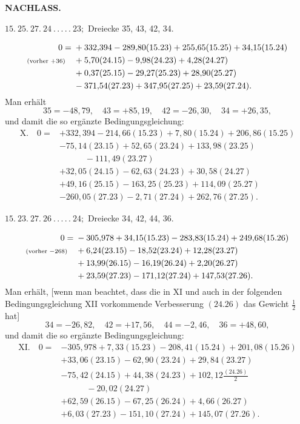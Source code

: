 \newpage
{}\hfill\textbf{NACHLASS.}
\begin{center}
$15.\ 25.\ 27.\ 24\ .\,.\,.\,.\,.\ 23;$ Dreiecke 35, 43, 42, 34.
\end{center}
\[
\begin{aligned}
0={}&+332{,}394-289{,}80(15.23)+255{,}65(15.25)+34{,}15(15.24)\\
\text{\scriptsize(vorher $+36$)}\quad&+5{,}70(24.15)-9{,}98(24.23)+4{,}28(24.27)\\
&+0{,}37(25.15)-29{,}27(25.23)+28{,}90(25.27)\\
&-371{,}54(27.23)+347{,}95(27.25)+23{,}59(27.24).
\end{aligned}
\]
Man erhält
\[
35=-48{,}79,\quad43=+85{,}19,\quad42=-26{,}30,\quad34=+26{,}35,
\]
und damit die so ergänzte Bedingungsgleichung:
\[
\begin{aligned}
\mathrm{X.}\quad0={}&+332{,}394-214{,}66(15.23)+7{,}80(15.24)+206{,}86(15.25)\\
&-75{,}14(23.15)+52{,}65(23.24)+133{,}98(23.25)\\
&\qquad\quad-111{,}49(23.27)\\
&+32{,}05(24.15)-62{,}63(24.23)+30{,}58(24.27)\\
&+49{,}16(25.15)-163{,}25(25.23)+114{,}09(25.27)\\
&-260{,}05(27.23)-2{,}71(27.24)+262{,}76(27.25).
\end{aligned}
\]

\par\bigskip
\begin{center}
$15.\ 23.\ 27.\ 26\ .\,.\,.\,.\,.\ 24;$ Dreiecke 34, 42, 44, 36.
\end{center}
\[
\begin{aligned}
0={}&-305{,}978+34{,}15(15.23)-283{,}83(15.24)+249{,}68(15.26)\\
\text{\scriptsize(vorher $-268$)}\quad&+6{,}24(23.15)-18{,}52(23.24)+12{,}28(23.27)\\
&+13{,}99(26.15)-16{,}19(26.24)+2{,}20(26.27)\\
&+23{,}59(27.23)-171{,}12(27.24)+147{,}53(27.26).
\end{aligned}
\]
Man erhält, [wenn man beachtet, dass die in XI und auch in der
folgenden Bedingungsgleichung XII vorkommende Verbesserung \((24.26)\) das
Gewicht \(\frac{1}{2}\) hat]
\[
34=-26{,}82,\quad42=+17{,}56,\quad44=-2{,}46,\quad36=+48{,}60,
\]
und damit die so ergänzte Bedingungsgleichung:
\[
\begin{aligned}
\mathrm{XI.}\quad0={}&-305{,}978+7{,}33(15.23)-208{,}41(15.24)+201{,}08(15.26)\\
&+33{,}06(23.15)-62{,}90(23.24)+29{,}84(23.27)\\
&-75{,}42(24.15)+44{,}38(24.23)+102{,}12\frac{(24.26)}{2}\\
&\qquad\quad-20{,}02(24.27)\\
&+62{,}59(26.15)-67{,}25(26.24)+4{,}66(26.27)\\
&+6{,}03(27.23)-151{,}10(27.24)+145{,}07(27.26).
\end{aligned}
\]

